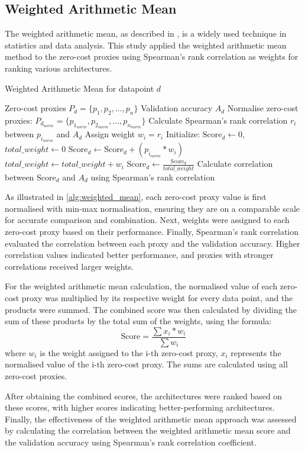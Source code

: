 
\subsection{Weighted Arithmetic Mean}
The weighted arithmetic mean, as described in \autocite{wam}, is a widely used technique in statistics and data analysis. This study applied the weighted arithmetic mean method to the zero-cost proxies using Spearman's rank correlation as weights for ranking various architectures.

\begin{algorithm}
\caption{Weighted Arithmetic Mean for datapoint $d$}\label{alg:weighted_mean}
\begin{algorithmic}[1]
\Require Zero-cost proxies $P_d = \{p_1, p_2, \dots, p_n\}$
\Require Validation accuracy $A_d$
\State Normalise zero-cost proxies: $P_{d_{norm}} = \{p_{1_{norm}}, p_{2_{norm}}, \dots, p_{n_{norm}}\}$
    \State Calculate Spearman's rank correlation $r_i$ between $p_{i_{norm}}$ and $A_d$
    \State Assign weight $w_i = r_i$
\EndFor
\State Initialize: $\text{Score}_d \leftarrow 0$, $total\_weight \leftarrow 0$
    \State $\text{Score}_d \leftarrow \text{Score}_d + (p_{i_{norm}} * w_i)$
    \State $total\_weight \leftarrow total\_weight + w_i$
\EndFor
\State $\text{Score}_d \leftarrow \frac{\text{Score}_d}{total\_weight}$
\State Calculate correlation between $\text{Score}_d$ and $A_d$ using Spearman's rank correlation
\end{algorithmic}
\end{algorithm}


As illustrated in \cref{alg:weighted_mean}, each zero-cost proxy value is first normalised with min-max normalisation, ensuring they are on a comparable scale for accurate comparison and combination. Next, weights were assigned to each zero-cost proxy based on their performance. Finally, Spearman's rank correlation evaluated the correlation between each proxy and the validation accuracy. Higher correlation values indicated better performance, and proxies with stronger correlations received larger weights.

For the weighted arithmetic mean calculation, the normalised value of each zero-cost proxy was multiplied by its respective weight for every data point, and the products were summed. The combined score was then calculated by dividing the sum of these products by the total sum of the weights, using the formula: \begin{equation*} \text{Score} = \frac{\sum x_i * w_i }{\sum w_i} \end{equation*} where $w_i$ is the weight assigned to the $\text{i-th}$ zero-cost proxy, $x_i$ represents the normalised value of the $\text{i-th}$ zero-cost proxy. The sums are calculated using all zero-cost proxies.

After obtaining the combined scores, the architectures were ranked based on these scores, with higher scores indicating better-performing architectures. Finally, the effectiveness of the weighted arithmetic mean approach was assessed by calculating the correlation between the weighted arithmetic mean score and the validation accuracy using Spearman's rank correlation coefficient.